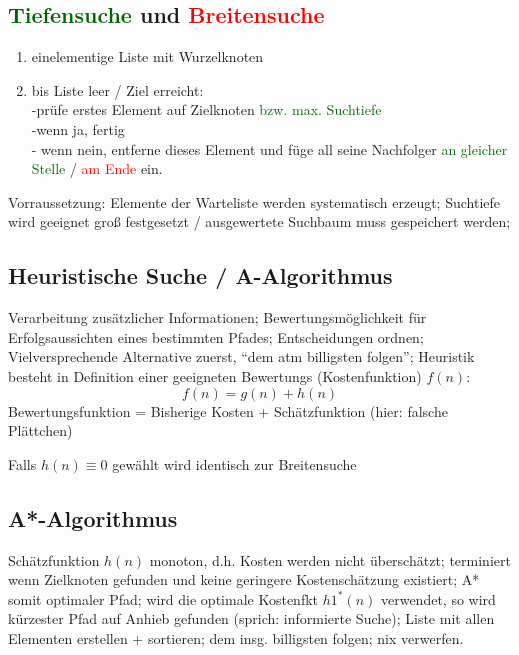 \documentclass[german,color,6pt]{latex4ei/latex4ei_sheet}
\begin{document}
\begin{sectionbox}
\subsection{\textcolor{darkgreen}{Tiefensuche} und \textcolor{red}{Breitensuche}}
\begin{enumerate}
	\item einelementige Liste mit Wurzelknoten
	\item bis Liste leer / Ziel erreicht: \\ -prüfe erstes Element auf Zielknoten \textcolor{darkgreen}{bzw. max. Suchtiefe} \\-wenn ja, fertig \\ - wenn nein, entferne dieses Element und füge all seine Nachfolger \textcolor{darkgreen}{ an gleicher Stelle} / \textcolor{red}{am Ende} ein.
\end{enumerate}

Vorraussetzung: Elemente der Warteliste werden systematisch erzeugt; Suchtiefe wird geeignet groß festgesetzt / ausgewertete Suchbaum muss gespeichert werden;
\end{sectionbox}

\begin{sectionbox}
\subsection{Heuristische Suche / A-Algorithmus}
Verarbeitung zusätzlicher Informationen; Bewertungsmöglichkeit für Erfolgsaussichten eines bestimmten Pfades; Entscheidungen ordnen; Vielversprechende Alternative zuerst, "`dem atm billigsten folgen"'; Heuristik besteht in Definition einer geeigneten Bewertungs (Kostenfunktion) $f(n)$:
\begin{equation*}
f(n) = g(n) + h(n)
\end{equation*}
Bewertungsfunktion = Bisherige Kosten + Schätzfunktion (hier: falsche Plättchen)

Falls $h(n) \equiv 0$ gewählt wird identisch zur Breitensuche
\end{sectionbox}

\begin{sectionbox}
\subsection{A*-Algorithmus}
Schätzfunktion $h(n)$ monoton, d.h. Kosten werden nicht überschätzt; terminiert wenn Zielknoten gefunden und keine geringere Kostenschätzung existiert; A* somit optimaler Pfad; wird die optimale Kostenfkt $h1^*(n)$ verwendet, so wird kürzester Pfad auf Anhieb gefunden (sprich: informierte Suche); Liste mit allen Elementen erstellen + sortieren; dem insg. billigsten folgen; nix verwerfen.
\end{sectionbox}
\end{document}
